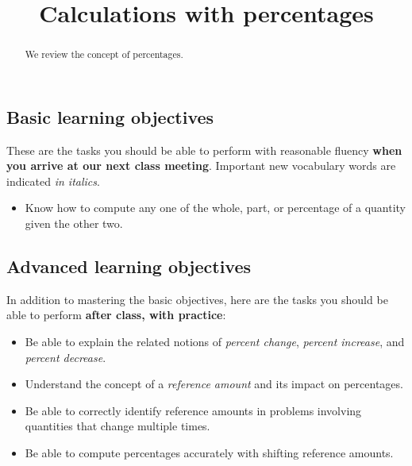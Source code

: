 \documentclass{ximera}
\title{Calculations with percentages}
\begin{document}
\begin{abstract}
We review the concept of percentages.
\end{abstract}
\maketitle

\subsection*{Basic learning objectives}

These are the tasks you should be able to perform with reasonable fluency \textbf{when you arrive at our next class meeting}. Important new vocabulary words are indicated \emph{in italics}. 

\begin{itemize}
	\item Know how to compute any one of the whole, part, or percentage of a quantity given the other two.
\end{itemize}

\subsection*{Advanced learning objectives}

In addition to mastering the basic objectives, here are the tasks you should be able to perform \textbf{after class, with practice}: 

\begin{itemize}
	\item Be able to explain the related notions of \emph{percent change}, \emph{percent increase}, and \emph{percent decrease}.
	\item Understand the concept of a \emph{reference amount} and its impact on percentages.
	\item Be able to correctly identify reference amounts in problems involving quantities that change multiple times.
	\item Be able to compute percentages accurately with shifting reference amounts.
\end{itemize}
\end{document}
